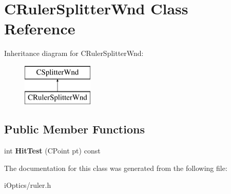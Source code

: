 \hypertarget{class_c_ruler_splitter_wnd}{}\section{C\+Ruler\+Splitter\+Wnd Class Reference}
\label{class_c_ruler_splitter_wnd}
Inheritance diagram for C\+Ruler\+Splitter\+Wnd\+:\begin{figure}[H]
\begin{center}
\leavevmode
\includegraphics[height=2.000000cm]{class_c_ruler_splitter_wnd}
\end{center}
\end{figure}
\subsection*{Public Member Functions}
\begin{DoxyCompactItemize}
\item 
\mbox{\label{class_c_ruler_splitter_wnd_a7caada869d685266a750c022e6e260ec}} 
int {\bfseries Hit\+Test} (C\+Point pt) const
\end{DoxyCompactItemize}


The documentation for this class was generated from the following file\+:\begin{DoxyCompactItemize}
\item 
i\+Optics/ruler.\+h\end{DoxyCompactItemize}
